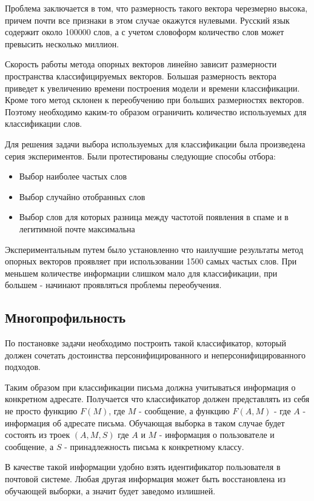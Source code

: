 Проблема заключается в том, что размерность такого вектора черезмерно высока, причем
почти все признаки в этом случае окажутся нулевыми. Русский язык содержит около 100000 слов, а с
учетом словоформ количество слов может превысить несколько миллион.

Скорость работы метода опорных векторов линейно зависит размерности пространства классифицируемых векторов.
Большая размерность вектора приведет к увеличению времени построения модели и времени классификации.
Кроме того метод склонен к переобучению при больших размерностях векторов. Поэтому необходимо каким-то образом ограничить количество используемых для классификации слов.

Для решения задачи выбора используемых для классификации была произведена серия экспериментов.
Были протестированы следующие способы отбора:
\begin{itemize}
\item Выбор наиболее частых слов
\item Выбор случайно отобранных слов
\item Выбор слов для которых разница между частотой появления в спаме и в легитимной почте максимальна
\end{itemize}

Экспериментальным путем было установленно что наилучшие результаты метод опорных векторов проявляет при использовании 1500 самых частых слов. При меньшем количестве информации слишком мало для классификации, при большем - начинают проявляться проблемы переобучения.

\subsection{Многопрофильность}
По постановке задачи необходимо построить такой классификатор, который должен сочетать достоинства персонифицированного и неперсонифицированного подходов. 

Таким образом при классификации письма должна учитываться информация о конкретном адресате. Получается что классификатор должен представлять из себя не просто функцию $F(M)$, где $M$ - сообщение, а функцию $F(A, M)$ - где $A$ - информация об адресате письма. 
Обучающая выборка в таком случае будет состоять из троек $(A, M, S)$  где $A$ и $M$ - информация о пользователе и сообщение, а $S$ - принадлежность письма к конкретному классу.

В качестве такой информации удобно взять идентификатор пользователя в почтовой системе. Любая другая информация может быть восстановлена из обучающей выборки, а значит будет заведомо излишней.

